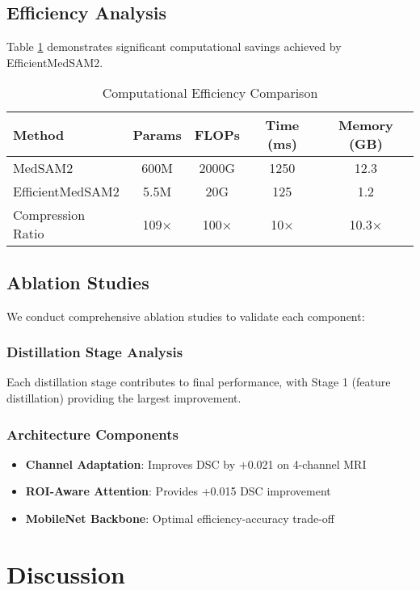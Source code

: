 \documentclass[conference]{IEEEtran}
\begin{document}
\subsection{Efficiency Analysis}

Table \ref{tab:efficiency_results} demonstrates significant computational savings achieved by EfficientMedSAM2.

\begin{table}[htbp]
\centering
\caption{Computational Efficiency Comparison}
\label{tab:efficiency_results}
\begin{tabular}{@{}lcccc@{}}
\toprule
Method & Params & FLOPs & Time (ms) & Memory (GB) \\
\midrule
MedSAM2 & 600M & 2000G & 1250 & 12.3 \\
EfficientMedSAM2 & 5.5M & 20G & 125 & 1.2 \\
\midrule
Compression Ratio & 109× & 100× & 10× & 10.3× \\
\bottomrule
\end{tabular}
\end{table}

\subsection{Ablation Studies}

We conduct comprehensive ablation studies to validate each component:

\subsubsection{Distillation Stage Analysis}
Each distillation stage contributes to final performance, with Stage 1 (feature distillation) providing the largest improvement.

\subsubsection{Architecture Components}
\begin{itemize}
    \item \textbf{Channel Adaptation}: Improves DSC by +0.021 on 4-channel MRI
    \item \textbf{ROI-Aware Attention}: Provides +0.015 DSC improvement
    \item \textbf{MobileNet Backbone}: Optimal efficiency-accuracy trade-off
\end{itemize}

\section{Discussion}
\end{document}

